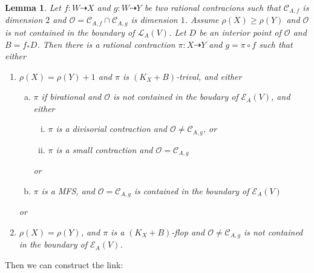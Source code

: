 \documentclass{article}
\newtheorem{lem}[defn]{Lemma}
\begin{document}
\begin{lem}
Let $ f:W\dashrightarrow X $ and $ g:W\dashrightarrow  Y $ be two rational contracions such that $ \mathcal{C}_{A,f} $ is dimension $ 2 $ and $ \mathcal{O}=\mathcal{C}_{A,f}\cap \mathcal{C}_{A,g} $ is dimension $ 1 $. Assume $ \rho(X)\geqslant \rho(Y) $ and $ \mathcal{O} $ is not contained in the boundary of $ \mathcal{L}_{A}(V) $. Let $ D $ be an interior point of $ \mathcal{O} $ and $ B=f_*D $. Then there is a rational contraction $ \pi:X\dashrightarrow Y $ and $ g=\pi\circ f $ such that either
\begin{enumerate}[1)]
\item $ \rho(X)=\rho(Y)+1 $ and $ \pi  $ is $ (K_X+B) $-trival, and either
\begin{enumerate}[a)]
\item $ \pi $ if birational and $ \mathcal{O} $ is not contained in the boudary of $ \mathcal{E}_A(V) $, and either
\begin{enumerate}[i)]
\item $ \pi $ is a divisorial contraction and $ \mathcal{O}\neq \mathcal{C}_{A,g} $, or
\item $ \pi $ is a small contraction and $ \mathcal{O}= \mathcal{C}_{A,g} $
\end{enumerate}
or
\item $ \pi $ is a MFS, and $ \mathcal{O}=\mathcal{C}_{A,g} $ is contained in the boundary of $ \mathcal{E}_{A}(V) $
\end{enumerate}
or
\item $ \rho(X)=\rho(Y) $, and $ \pi $ is  a $ (K_X+B) $-flop and $ \mathcal{O}\neq\mathcal{C}_{A,g} $ is not contained in the boundary of $ \mathcal{E}_A(V) $.
\end{enumerate}
\end{lem}

Then we can construct the link:
\end{document}
